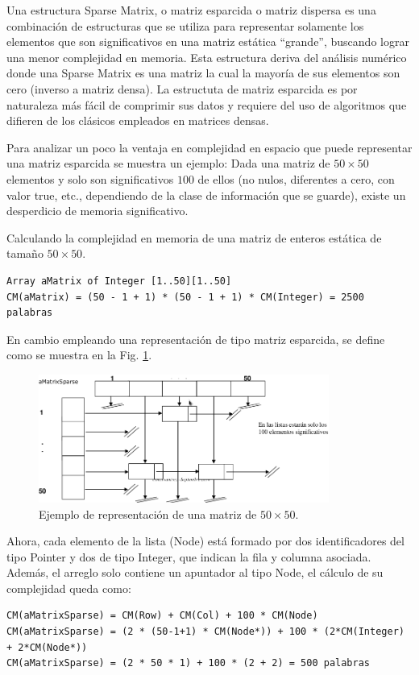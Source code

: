 Una estructura Sparse Matrix, o matriz esparcida o matriz dispersa es una combinación de estructuras que se utiliza para representar solamente los elementos que son significativos en una matriz estática “grande”, buscando lograr una menor complejidad en memoria. Esta estructura deriva del análisis numérico donde una Sparse Matrix es una matriz la cual la mayoría de sus elementos son cero (inverso a matriz densa). La estructuta de matriz esparcida es por naturaleza más fácil de comprimir sus datos y requiere del uso de algoritmos que difieren de los clásicos empleados en matrices densas.

Para analizar un poco la ventaja en complejidad en espacio que puede representar una matriz esparcida se muestra un ejemplo: Dada una matriz de $50 \times 50$ elementos y solo son significativos $100$ de ellos (no nulos, diferentes a cero, con valor true, etc., dependiendo de la clase de información que se guarde), existe un desperdicio de memoria significativo.

Calculando la complejidad en memoria de una matriz de enteros estática de tamaño $50 \times 50$.
\begin{lstlisting}[upquote=true, language=pseudo]
Array aMatrix of Integer [1..50][1..50]
CM(aMatrix) = (50 - 1 + 1) * (50 - 1 + 1) * CM(Integer) = 2500 palabras
\end{lstlisting}

En cambio empleando una representación de tipo matriz esparcida, se define como se muestra en la Fig. \ref{fig:sparse}.

\begin{figure}[htp!]
  \begin{center}
    \includegraphics[width=0.85\textwidth]{images/sparse.png}
  \end{center}
  \caption{Ejemplo de representación de una matriz de $50 \times 50$.}
  \label{fig:sparse}
\end{figure}

Ahora, cada elemento de la lista (Node) está formado por dos identificadores del tipo Pointer y dos de tipo Integer, que indican la fila y columna asociada. Además, el arreglo solo contiene un apuntador al tipo Node, el cálculo de su complejidad queda como:
\begin{lstlisting}[upquote=true, language=pseudo]
CM(aMatrixSparse) = CM(Row) + CM(Col) + 100 * CM(Node)
CM(aMatrixSparse) = (2 * (50-1+1) * CM(Node*)) + 100 * (2*CM(Integer) + 2*CM(Node*))
CM(aMatrixSparse) = (2 * 50 * 1) + 100 * (2 + 2) = 500 palabras
\end{lstlisting}

